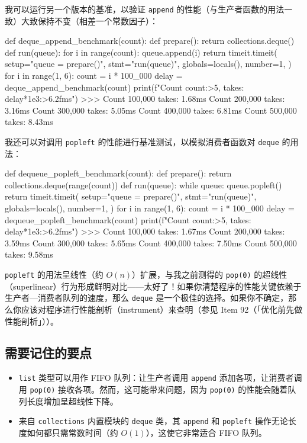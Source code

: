 我可以运行另一个版本的基准，以验证 \texttt{append} 的性能（与生产者函数的用法一致）大致保持不变（相差一个常数因子）：

\begin{codebox}[python]
def deque_append_benchmark(count):
    def prepare():
        return collections.deque()
    def run(queue):
        for i in range(count):
            queue.append(i)
    return timeit.timeit(
        setup="queue = prepare()",
        stmt="run(queue)",
        globals=locals(),
        number=1,
    )
for i in range(1, 6):
    count = i * 100_000
    delay = deque_append_benchmark(count)
    print(f"Count {count:>5,} takes: {delay*1e3:>6.2f}ms")
>>>
Count 100,000 takes:   1.68ms
Count 200,000 takes:   3.16ms
Count 300,000 takes:   5.05ms
Count 400,000 takes:   6.81ms
Count 500,000 takes:   8.43ms
\end{codebox}

我还可以对调用 \texttt{popleft} 的性能进行基准测试，以模拟消费者函数对 \texttt{deque} 的用法：

\begin{codebox}[python]
def dequeue_popleft_benchmark(count):
    def prepare():
        return collections.deque(range(count))
    def run(queue):
        while queue:
            queue.popleft()
    return timeit.timeit(
        setup="queue = prepare()",
        stmt="run(queue)",
        globals=locals(),
        number=1,
    )
for i in range(1, 6):
    count = i * 100_000
    delay = dequeue_popleft_benchmark(count)
    print(f"Count {count:>5,} takes: {delay*1e3:>6.2f}ms")
>>>
Count 100,000 takes:   1.67ms
Count 200,000 takes:   3.59ms
Count 300,000 takes:   5.65ms
Count 400,000 takes:   7.50ms
Count 500,000 takes:   9.58ms
\end{codebox}

\texttt{popleft} 的用法呈线性（约 $O(n)$）扩展，与我之前测得的 \texttt{pop(0)} 的超线性（superlinear）行为形成鲜明对比——太好了！如果你清楚程序的性能关键依赖于生产者—消费者队列的速度，那么 \texttt{deque} 是一个极佳的选择。如果你不确定，那么你应该对程序进行性能剖析（instrument）来查明（参见 Item 92（「优化前先做性能剖析」））。

\subsection{需要记住的要点}

\begin{itemize}
\item \texttt{list} 类型可以用作 FIFO 队列：让生产者调用 \texttt{append} 添加各项，让消费者调用 \texttt{pop(0)} 接收各项。然而，这可能带来问题，因为 \texttt{pop(0)} 的性能会随着队列长度增加呈超线性下降。
\item 来自 \texttt{collections} 内置模块的 \texttt{deque} 类，其 \texttt{append} 和 \texttt{popleft} 操作无论长度如何都只需常数时间（约 $O(1)$），这使它非常适合 FIFO 队列。
\end{itemize}

